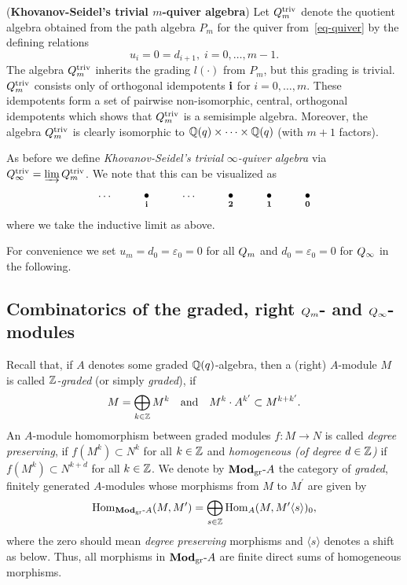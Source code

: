 \begin{defn}\label{defn-trivial}(\textbf{Khovanov-Seidel's trivial $m$-quiver algebra})
Let $Q_m^{\mathrm{triv}}$ denote the quotient algebra 
obtained from the path algebra $P_m$ for 
the quiver from~\eqref{eq-quiver} by the defining relations
\[
u_{i}=0=d_{i+1},\;i=0,\dots,m-1.
\]
The algebra $Q_m^{\mathrm{triv}}$ inherits the grading 
$l(\cdot)$ from $P_m$, but this grading is trivial. 
$Q_m^{\mathrm{triv}}$ consists only of orthogonal idempotents $\boldsymbol{\mathrm{i}}$ for $i=0,\dots, m$. These idempotents 
form a set of pairwise non-isomorphic, central, orthogonal idempotents which shows 
that $Q_m^{\mathrm{triv}}$ is a semisimple algebra. Moreover, the algebra $Q_m^{\mathrm{triv}}$ is clearly isomorphic to $\mathbb{Q}(q)\times\dots\times\mathbb{Q}(q)$ (with $m+1$ factors).



As before we define \textit{Khovanov-Seidel's trivial} $\infty$\textit{-quiver algebra} via $Q_{\infty}^{\mathrm{triv}}=\varinjlim Q_m^{\mathrm{triv}}$. We note that this can be visualized as
\[
\xymatrix{
   \cdots &  \raisebox{0.1cm}{\xy(0,0)*{\bullet};(0,-2.5)*{\scriptstyle \bbi};\endxy}  & \cdots  & \raisebox{0.1cm}{\xy(0,0)*{\bullet};(0,-2.5)*{\scriptstyle \bbt};\endxy} & \raisebox{0.1cm}{\xy(0,0)*{\bullet};(0,-2.5)*{\scriptstyle \bbo};\endxy} & \raisebox{0.1cm}{\xy(0,0)*{\bullet};(0,-2.5)*{\scriptstyle \bbz};\endxy}\\
}
\]
where we take the inductive limit as above.
\end{defn}



For convenience we set $u_m=d_0=\varepsilon_0=0$ for all $Q_{m}$ and $d_0=\varepsilon_0=0$ for $Q_{\infty}$ in the following.



\subsection{Combinatorics of the graded, right \texorpdfstring{$Q_{m}$}{Qm}- and \texorpdfstring{$Q_{\infty}$}{Ain}-modules}\label{sub-ammod}
Recall that, if $A$ denotes some 
graded $\mathbb{Q}(q)$-algebra, then a (right) 
$A$-module $M$ is called \textit{$\mathbb{Z}$-graded} (or simply \textit{graded}), if
\[
M=\bigoplus_{k\in\mathbb{Z}}M^k\quad\text{and}\quad M^k\cdot A^{k^{\prime}}\subset M^{k+k^{\prime}}.
\]
An $A$-module homomorphism between 
graded modules $f\colon M\to N$ is called 
\textit{degree preserving}, if $f(M^k)\subset N^k$ 
for all $k\in\mathbb{Z}$ and \textit{homogeneous 
(of degree $d\in\mathbb{Z}$)} if $f(M^k)\subset N^{k+d}$ for all $k\in\mathbb{Z}$.
We denote by $\boldsymbol{\mathrm{Mod}}_{\mathrm{gr}}\text{-}A$ the category of 
\textit{graded}, finitely generated $A$-modules 
whose morphisms from $M$ to $M^{\prime}$ are given by
\begin{equation}\label{eq-gradhom}
\mathrm{Hom}_{\boldsymbol{\mathrm{Mod}}_{\mathrm{gr}}\text{-}A}(M,M^{\prime})=\bigoplus_{s\in\mathbb{Z}}\mathrm{Hom}_{A}(M,M^{\prime}\langle s\rangle)_{0},
\end{equation}
where the zero should mean \textit{degree preserving} 
morphisms and $\langle s\rangle$ 
denotes a shift as below. Thus, all morphisms in $\boldsymbol{\mathrm{Mod}}_{\mathrm{gr}}\text{-}A$ are finite 
direct sums of homogeneous morphisms.




